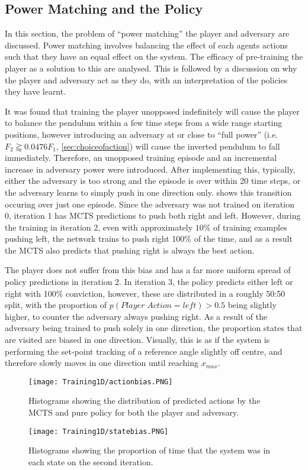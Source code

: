 \documentclass[../main.tex]{subfiles}
\begin{document}
\subsection{Power Matching and the Policy}

In this section, the problem of ``power matching'' the player and adversary are discussed. Power matching involves balancing the effect of each agents actions such that they have an equal effect on the system. The efficacy of pre-training the player as a solution to this are analysed. This is followed by a discussion on why the player and adversary act as they do, with an interpretation of the policies they have learnt.

It was found that training the player unopposed indefinitely will cause the player to balance the pendulum within a few time steps from a wide range starting positions, however introducing an adversary at or close to ``full power'' (i.e. $F_2  \gtrapprox  0.0476F_1$, \cref{sec:choiceofaction}) will cause the inverted pendulum to fall immediately. Therefore, an unopposed training episode and an incremental increase in adversary power were introduced. After implementing this, typically, either the adversary is too strong and the episode is over within 20 time steps, or the adversary learns to simply push in one direction only.  shows this transition occuring over just one episode. Since the adversary was not trained on iteration 0, iteration 1 has MCTS predictions to push both right and left. However, during the training in iteration 2, even with approximately $10\%$ of training examples pushing left, the network trains to push right 100\% of the time, and as a result the MCTS also predicts that pushing right is always the best action.

The player does not suffer from this bias and has a far more uniform spread of policy predictions in iteration 2. In iteration 3, the policy predicts either left or right with 100\% conviction, however, these are distributed in a roughly 50:50 split, with the proportion of $p(Player \; Action = left) > 0.5$ being slightly higher, to counter the adversary always pushing right. As a result of the adversary being trained to push solely in one direction, the proportion states that are visited are biased in one direction. Visually, this is as if the system is performing the set-point tracking of a reference angle slightly off centre, and therefore slowly moves in one direction until reaching $x_{max}$.

\begin{figure}[H]
    \centering
    \texttt{[image: Training1D/actionbias.PNG]}
    \caption{Histograms showing the distribution of predicted actions by the MCTS and pure policy for both the player and adversary.}
    \label{fig:actionbias}
    \vspace{0.7cm}
    \centering
    \texttt{[image: Training1D/statebias.PNG]}
    \caption{Histograms showing the proportion of time that the system was in each state on the second iteration.}
    \label{fig:statebias}
\end{figure}
\end{document}
